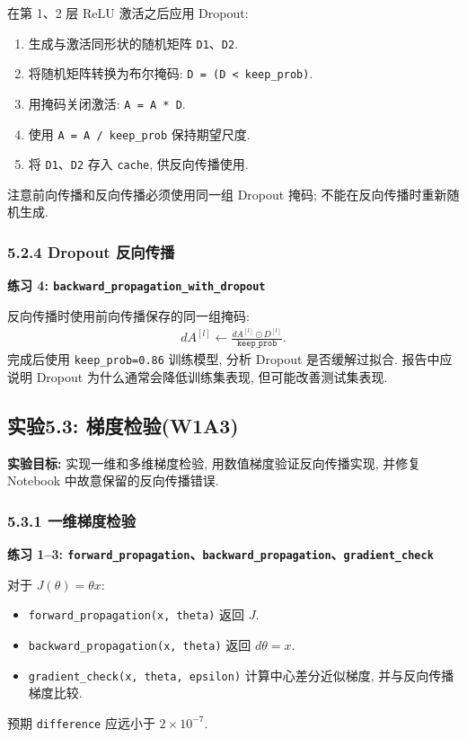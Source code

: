 \documentclass{../../nndlcourse}
\begin{document}
在第 1、2 层 ReLU 激活之后应用 Dropout:
\begin{enumerate}
    \item 生成与激活同形状的随机矩阵 \texttt{D1}、\texttt{D2}.
    \item 将随机矩阵转换为布尔掩码: \texttt{D = (D < keep\_prob)}.
    \item 用掩码关闭激活: \texttt{A = A * D}.
    \item 使用 \texttt{A = A / keep\_prob} 保持期望尺度.
    \item 将 \texttt{D1}、\texttt{D2} 存入 \texttt{cache}, 供反向传播使用.
\end{enumerate}
注意前向传播和反向传播必须使用同一组 Dropout 掩码; 不能在反向传播时重新随机生成.

\subsubsection*{5.2.4 Dropout 反向传播}

\textbf{练习 4: \texttt{backward\_propagation\_with\_dropout}}

反向传播时使用前向传播保存的同一组掩码:
\begin{align}
    dA^{[l]} \leftarrow
    \frac{dA^{[l]}\odot D^{[l]}}{\texttt{keep\_prob}}.
\end{align}
完成后使用 \texttt{keep\_prob=0.86} 训练模型, 分析 Dropout 是否缓解过拟合. 报告中应说明 Dropout 为什么通常会降低训练集表现, 但可能改善测试集表现.

\subsection*{实验5.3: 梯度检验(W1A3)}

\textbf{实验目标: }实现一维和多维梯度检验, 用数值梯度验证反向传播实现, 并修复 Notebook 中故意保留的反向传播错误.

\subsubsection*{5.3.1 一维梯度检验}

\textbf{练习 1--3: \texttt{forward\_propagation}、\texttt{backward\_propagation}、\texttt{gradient\_check}}

对于 $J(\theta)=\theta x$:
\begin{itemize}
    \item \texttt{forward\_propagation(x, theta)} 返回 $J$.
    \item \texttt{backward\_propagation(x, theta)} 返回 $d\theta=x$.
    \item \texttt{gradient\_check(x, theta, epsilon)} 计算中心差分近似梯度, 并与反向传播梯度比较.
\end{itemize}
预期 \texttt{difference} 应远小于 $2\times 10^{-7}$.
\end{document}
